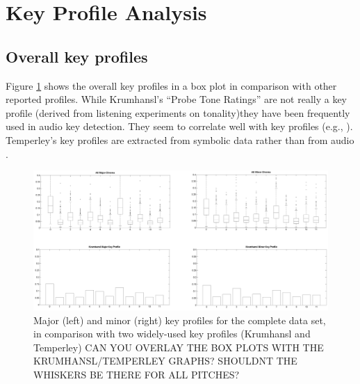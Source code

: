 \documentclass{article}
\begin{document}

\section{Key Profile Analysis}
\subsection{Overall key profiles}
Figure \ref{fig:OverallKeyProfiles} shows the overall key profiles in a box plot in comparison with other reported profiles. 
While Krumhansl's ``Probe Tone Ratings'' \cite{krumhansl_cognitive_1990} are not really a key profile (derived from listening experiments on tonality)they have been frequently used in audio key detection. They seem to correlate well with key profiles (e.g., \cite{izmirli_template_2005}). 
Temperley's key profiles are extracted from symbolic data  rather than from audio \cite{temperley_bayesian_2004,temperley_pitch-class_2008}.
\begin{figure}[tb]
    \includegraphics[scale=.4]{graph/overall_boxplot}
	\caption{Major (left) and minor (right) key profiles for the complete data set, in comparison with two widely-used key profiles (Krumhansl and Temperley) CAN YOU OVERLAY THE BOX PLOTS WITH THE KRUMHANSL/TEMPERLEY GRAPHS? SHOULDNT THE WHISKERS BE THERE FOR ALL PITCHES?}
	\label{fig:OverallKeyProfiles}
\end{figure}
\end{document}
